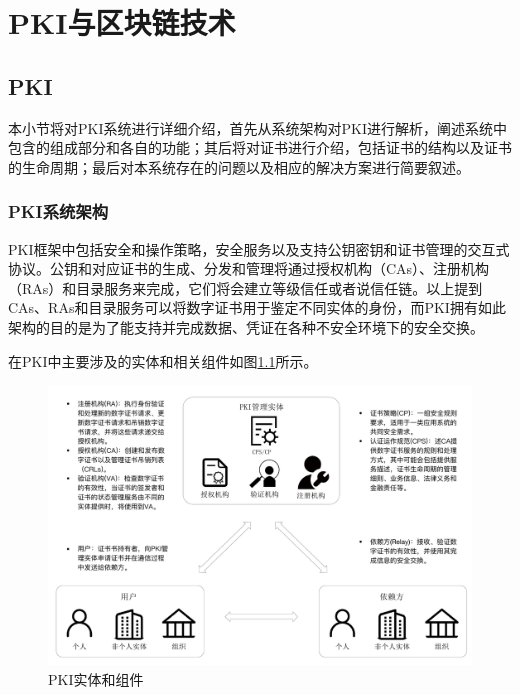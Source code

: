 
\chapter{PKI与区块链技术}



\section{PKI}

本小节将对PKI系统进行详细介绍，首先从系统架构对PKI进行解析，阐述系统中包含的组成部分和各自的功能；其后将对证书进行介绍，包括证书的结构以及证书的生命周期；最后对本系统存在的问题以及相应的解决方案进行简要叙述。

\subsection{PKI系统架构}


PKI框架中包括安全和操作策略，安全服务以及支持公钥密钥和证书管理的交互式协议。公钥和对应证书的生成、分发和管理将通过授权机构（CAs）、注册机构（RAs）和目录服务来完成\cite{weise2001public}，它们将会建立等级信任或者说信任链。以上提到CAs、RAs和目录服务可以将数字证书用于鉴定不同实体的身份，而PKI拥有如此架构的目的是为了能支持并完成数据、凭证在各种不安全环境下的安全交换。

在PKI中主要涉及的实体和相关组件如图\ref{fig:pki}所示。

\begin{figure}[htbp]
 	\centering
 	\includegraphics[width = 1\textwidth]{img/pki}
 	\caption{PKI实体和组件}\label{fig:pki}
\end{figure}



